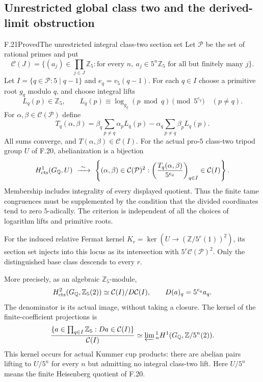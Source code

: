 \subsection{Unrestricted global class two and the derived-limit obstruction}

\begin{statement}{F.21}{Proved}{The unrestricted integral class-two section set}
Let $\mathcal P$ be the set of rational primes and put
\[
 \mathcal C(J)=\bigl\{(a_j)\in\prod_{j\in J}\mathbb Z_5:
      \text{for every }n,\ a_j\in5^n\mathbb Z_5
                         \text{ for all but finitely many }j\bigr\}.
\]
Let $I=\{q\in\mathcal P:5\mid q-1\}$ and
$e_q=v_5(q-1)$. For each $q\in I$ choose a primitive
root $g_q$ modulo $q$, and choose integral lifts
\[
 L_q(p)\in\mathbb Z_5,\qquad
 L_q(p)\equiv\log_{g_q}(p\bmod q)\pmod {5^{e_q}}
                 \quad(p\ne q).
\]
For $\alpha,\beta\in\mathcal C(\mathcal P)$ define
\[
 T_q(\alpha,\beta)=
 \beta_q\sum_{p\ne q}\alpha_pL_q(p)
       -\alpha_q\sum_{p\ne q}\beta_pL_q(p).
\]
All sums converge, and $T(\alpha,\beta)\in\mathcal C(I)$.
For the actual pro-$5$ class-two tripod group $U$ of F.20,
abelianization is a bijection
\[
 H^1_{\rm cts}(G_{\mathbb Q},U)\ \xrightarrow{\ \sim\ }\
 \left\{(\alpha,\beta)\in\mathcal C(\mathcal P)^2:
       \left(\frac{T_q(\alpha,\beta)}{5^{e_q}}\right)_{q\in I}
                                      \in\mathcal C(I)\right\}.
\]
Membership includes integrality of every displayed quotient.
Thus the finite tame congruences must be supplemented by
the condition that the divided coordinates tend to zero
$5$-adically. The criterion is independent of all the
choices of logarithm lifts and primitive roots.

For the induced relative Fermat kernel
$K_r=\ker(U\to(\mathbb Z/5^r(1))^2)$, its section
set injects into this locus as its intersection with
$5^r\mathcal C(\mathcal P)^2$. Only the distinguished
base class descends to every $r$.

More precisely, as an algebraic $\mathbb Z_5$-module,
\[
 H^2_{\rm cts}(G_{\mathbb Q},\mathbb Z_5(2))
   \simeq\mathcal C(I)/D\mathcal C(I),\qquad
                 D(a)_q=5^{e_q}a_q.
\]
The denominator is its actual image, without taking a
closure. The kernel of the finite-coefficient projections is
\[
 \frac{\{a\in\prod_{q\in I}\mathbb Z_5:Da\in\mathcal C(I)\}}
      {\mathcal C(I)}
 \simeq
 \varprojlim{}^1_n
       H^1(G_{\mathbb Q},\mathbb Z/5^n(2)).
\]
This kernel occurs for actual Kummer cup products: there
are abelian pairs lifting to $U/5^n$ for every $n$ but
admitting no integral class-two lift. Here $U/5^n$ means
the finite Heisenberg quotient of F.20.
\end{statement}
